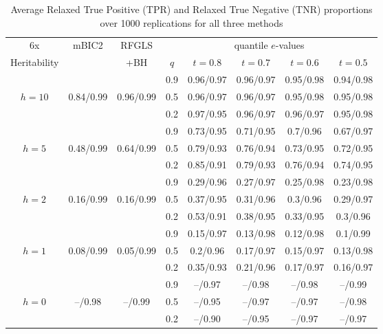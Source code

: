 \begin{table}
\begin{footnotesize}
\centering
    \begin{tabular}{c|c|c|c|cccc}
    \hline
    6x    & mBIC2       & RFGLS  & \multicolumn{5}{|c}{quantile $e$-values}    \\\cline{4-8}
    Heritability    &           & +BH		 & $q$    & $t=0.8$     & $t=0.7$     & $t=0.6$     & $t=0.5$     \\ \hline
    ~    & ~         & ~         & 0.9      & 0.96/0.97 & 0.96/0.97 & 0.95/0.98 & 0.94/0.98 \\
    $h=10$ & 0.84/0.99 & 0.96/0.99 & 0.5      & 0.96/0.97 & 0.96/0.97 & 0.95/0.98 & 0.95/0.98 \\
    ~    & ~         & ~         & 0.2      & 0.97/0.95 & 0.96/0.97 & 0.96/0.97 & 0.95/0.98 \\\hline
    ~    & ~         & ~         & 0.9      & 0.73/0.95 & 0.71/0.95 & 0.7/0.96  & 0.67/0.97 \\
    $h=5$  & 0.48/0.99 & 0.64/0.99 & 0.5      & 0.79/0.93 & 0.76/0.94 & 0.73/0.95 & 0.72/0.95 \\
    ~    & ~         & ~         & 0.2      & 0.85/0.91 & 0.79/0.93 & 0.76/0.94 & 0.74/0.95 \\\hline
    ~    & ~         & ~         & 0.9      & 0.29/0.96 & 0.27/0.97 & 0.25/0.98 & 0.23/0.98 \\
    $h=2$  & 0.16/0.99 & 0.16/0.99    & 0.5      & 0.37/0.95 & 0.31/0.96 & 0.3/0.96  & 0.29/0.97 \\
    ~    & ~         & ~         & 0.2      & 0.53/0.91 & 0.38/0.95 & 0.33/0.95 & 0.3/0.96  \\\hline
    ~    & ~         & ~         & 0.9      & 0.15/0.97 & 0.13/0.98 & 0.12/0.98 & 0.1/0.99  \\
    $h=1$  & 0.08/0.99 & 0.05/0.99    & 0.5      & 0.2/0.96  & 0.17/0.97 & 0.15/0.97 & 0.13/0.98 \\
    ~    & ~         & ~         & 0.2      & 0.35/0.93 & 0.21/0.96 & 0.17/0.97 & 0.16/0.97 \\\hline
    ~    & ~         & ~         & 0.9      & --/0.97 & --/0.98 & --/0.98 & --/0.99 \\
    $h=0$  & --/0.98 & --/0.99    & 0.5      & --/0.95 & --/0.97 & --/0.97 & --/0.98 \\
    ~    & ~         & ~         & 0.2      & --/0.90 & --/0.95 & --/0.97 & --/0.97 \\\hline
    \end{tabular}
    \caption{Average Relaxed True Positive (TPR) and Relaxed True Negative (TNR) proportions over 1000 replications for all three methods}
    \label{table:SNPSimTable1}
\end{footnotesize}
\end{table}

